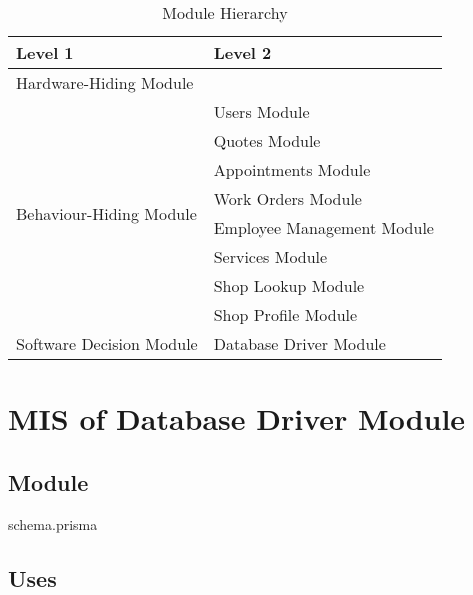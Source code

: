 \documentclass[12pt, titlepage]{article}
\begin{document}
\begin{table}[H]
	\centering
	\begin{tabular}{p{} p{}}
		\toprule
		\textbf{Level 1}                                      & \textbf{Level 2}           \\
		\midrule

		Hardware-Hiding Module                                & ~                          \\

		\midrule

		\multirow{8}{0.3\textwidth}{Behaviour-Hiding Module}  & Users Module               \\
		                                                      & Quotes Module              \\
		                                                      & Appointments Module        \\
		                                                      & Work Orders Module         \\
		                                                      & Employee Management Module \\
		                                                      & Services Module            \\
		                                                      & Shop Lookup Module         \\
		                                                      & Shop Profile Module        \\
		\midrule

		\multirow{1}{0.3\textwidth}{Software Decision Module} & Database Driver Module     \\

		\bottomrule
	\end{tabular}
	\caption{Module Hierarchy}
	\label{TblMH}
\end{table}

\newpage

\section{MIS of Database Driver Module} \label{mDBDriver}
\subsection{Module}

schema.prisma

\subsection{Uses}
\end{document}
